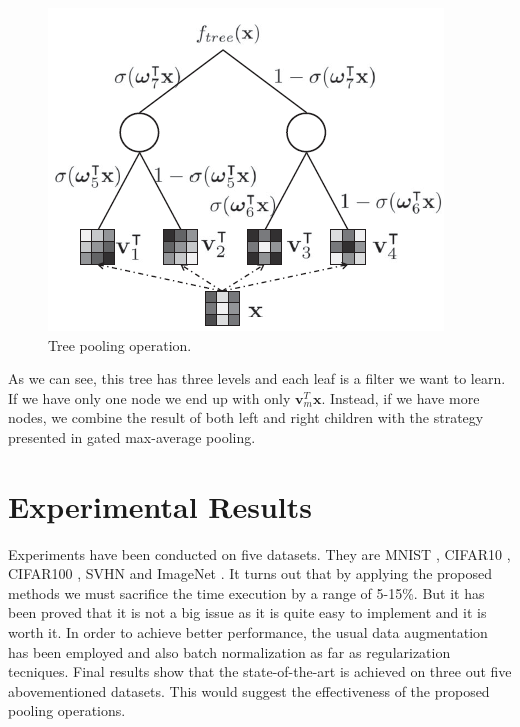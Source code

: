 \begin{figure}[h!]
    \centering
    \includegraphics[scale=0.65]{images/08_2.png}
    \caption{Tree pooling operation.}
    \label{fig:08_2}
\end{figure}

\FloatBarrier

As we can see, this tree has three levels and each leaf is a filter we want to learn. If we have only one node we end up with only $\textbf{v}_m^T \textbf{x}$. Instead, if we have more nodes, we combine the result of both left and right children with the strategy presented in gated max-average pooling.

\section{Experimental Results}

Experiments have been conducted on five datasets. They are MNIST \citep{MNIST}, CIFAR10 \citep{CIFAR10and100}, CIFAR100 \citep{CIFAR10and100}, SVHN \citep{SVHN} and ImageNet \citep{ImageNet12}. It turns out that by applying the proposed methods we must sacrifice the time execution by a range of 5-15\%. But it has been proved that it is not a big issue as it is quite easy to implement and it is worth it. In order to achieve better performance, the usual data augmentation has been employed and also batch normalization as far as regularization tecniques. Final results show that the state-of-the-art is achieved on three out five abovementioned datasets. This would suggest the effectiveness of the proposed pooling operations. 


